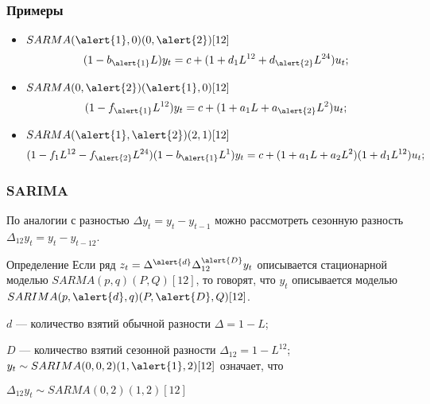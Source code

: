 \begin{frame}
  \frametitle{Примеры}

  \begin{itemize}[<+->]
    \item $SARMA(\alert{1},0)(0,\alert{2})[12]$
    \[
    (1 - b_{\alert{1}} L) y_t = c + (1 + d_1 L^{12} + d_{\alert{2}} L^{24}) u_t;  
    \]
    \item $SARMA(0,\alert{2})(\alert{1},0)[12]$
    \[
    (1 - f_{\alert{1}} L^{12}) y_t = c + (1 + a_1 L + a_{\alert{2}} L^2) u_t;  
    \]
    \item $SARMA(\alert{1},\alert{2})(2,1)[12]$
    \[
    (1 - f_1 L^{12} - f_{\alert{2}} L^{24}) (1 - b_{\alert{1}} L^1) y_t = c + (1 + a_1 L + a_2 L^2) (1 + d_1 L^{12}) u_t;  
    \]
  \end{itemize}

  

\end{frame}





\begin{frame}
  \frametitle{SARIMA}

  По аналогии с разностью $\Delta y_t = y_t - y_{t-1}$ можно рассмотреть сезонную разность $\Delta_{12} y_t = y_t - y_{t-12}$. 

  \pause 
  \begin{block}{Определение}
    Если ряд $z_t = \Delta^{\alert{d}} \Delta^{\alert{D}}_{12} y_t$ описывается стационарной моделью $SARMA(p, q)(P, Q)[12]$,
    то говорят, что $y_t$ описывается моделью $SARIMA(p, \alert{d}, q)(P, \alert{D}, Q)[12]$.
  \end{block}
  \pause
  $d$ — количество взятий обычной разности $\Delta = 1 - L$;

  $D$ — количество взятий сезонной разности $\Delta_{12} = 1- L^{12}$;
  \pause
  $y_t \sim SARIMA(0, 0, 2)(1, \alert{1}, 2)[12]$ означает, что 
  
  $\Delta_{12} y_t \sim SARMA(0, 2)(1, 2)[12]$
\end{frame}

